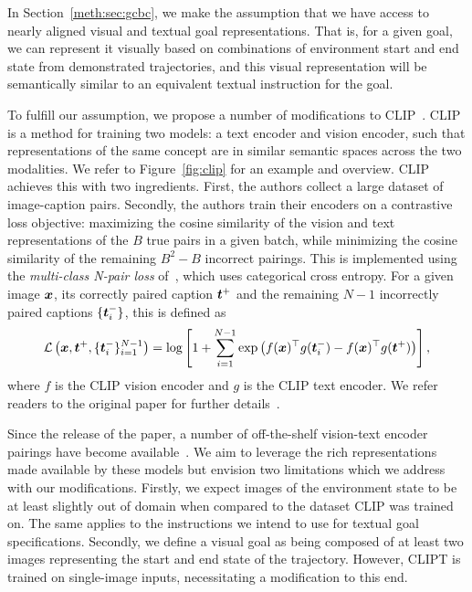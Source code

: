\documentclass[../main.tex]{subfiles}
\begin{document}
In Section~\ref{meth:sec:gcbc}, we make the assumption that we have access to nearly aligned visual
and textual goal representations. That is, for a given goal, we can represent it visually based on
combinations of environment start and end state from demonstrated trajectories, and this visual representation
will be semantically similar to an equivalent textual instruction for the goal.

To fulfill our assumption, we propose a number of modifications to CLIP~\citep{radford_learning_2021}. CLIP is a method for training two models: a text
encoder and vision encoder, such that representations of the same concept are in similar
semantic spaces across the two modalities. We refer to Figure~\ref{fig:clip} for an example and
overview. CLIP
achieves this with two ingredients. First, the authors collect a large dataset of image-caption
pairs. Secondly, the authors train their encoders on a contrastive loss objective: maximizing the
cosine similarity of the vision and text representations of the $B$ true pairs in a given batch,
while minimizing the cosine similarity of the remaining $B^2 - B$ incorrect pairings. This is implemented using the \textit{multi-class N-pair loss} of~\citet{sohn_improved_2016}, which uses categorical cross entropy. For a given image $\bm x$, its correctly paired caption $\bm t^+$ and the remaining $N-1$ incorrectly paired captions $\{\bm t^-_i\}$, this is defined as
\begin{equation}
	\mathcal{L}\left(\bm x, \bm t^+, \{\bm t^-_i\}^{N-1}_{i=1}\right)
	= \log\left[1 + \sum_{i=1}^{N-1} \exp\left(f(\bm x)^\top g(\bm t^-_i) - f(\bm x)^\top g(\bm t^+)\right)\right],
\end{equation}
where $f$ is the CLIP vision encoder and $g$ is the CLIP text encoder. We refer
readers to the original paper for further details~\citep{radford_learning_2021}.

Since the release of the paper, a number of off-the-shelf vision-text encoder pairings have become
available~\citep{ilharco_openclip_2021, schuhmann_laion-5b_2022}. We aim to leverage the rich
representations made available by these models but envision two limitations which we address with
our modifications. Firstly, we expect images of the environment state to be at least slightly out of
domain when compared to the dataset CLIP was trained on. The same applies to the instructions we
intend to use for textual goal specifications. Secondly, we define a visual goal as being composed
of at least two images representing the start and end state of the trajectory.
However, CLIPT is trained on single-image inputs, necessitating a modification to this end.
\end{document}
